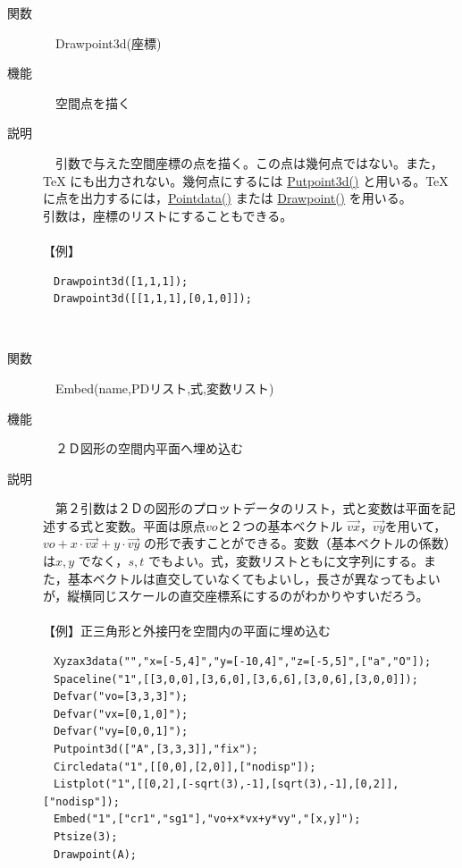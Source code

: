 \documentclass[papersize,a4paper,12pt,uplatex]{jsarticle}
\begin{document}
\begin{description}
\hypertarget{drawpoint3d}{}
\item[関数]　Drawpoint3d(座標)
\item[機能]　空間点を描く
\item[説明]　引数で与えた空間座標の点を描く。この点は幾何点ではない。また，TeX にも出力されない。幾何点にするには \hyperlink{putpoint3d}{Putpoint3d()} と用いる。TeXに点を出力するには，\hyperlink{pointdata}{Pointdata()} または \hyperlink{drwpt}{Drawpoint()} を用いる。\\
引数は，座標のリストにすることもできる。\\
　\\
【例】
\begin{verbatim}
　Drawpoint3d([1,1,1]);
　Drawpoint3d([[1,1,1],[0,1,0]]);
\end{verbatim}
　\\

\hypertarget{embed}{}
\item[関数]　Embed(name,PDリスト,式,変数リスト)
\item[機能]　２Ｄ図形の空間内平面へ埋め込む
\item[説明]　第２引数は２Ｄの図形のプロットデータのリスト，式と変数は平面を記述する式と変数。平面は原点$vo$と２つの基本ベクトル $\overrightarrow{vx}，\overrightarrow{vy}$を用いて，$vo+x \cdot \overrightarrow{vx}+y \cdot \overrightarrow{vy}$ の形で表すことができる。変数（基本ベクトルの係数）は$x,y$ でなく，$s,t$ でもよい。式，変数リストともに文字列にする。また，基本ベクトルは直交していなくてもよいし，長さが異なってもよいが，縦横同じスケールの直交座標系にするのがわかりやすいだろう。\\
　\\
【例】正三角形と外接円を空間内の平面に埋め込む
\begin{verbatim}
　Xyzax3data("","x=[-5,4]","y=[-10,4]","z=[-5,5]",["a","O"]);
　Spaceline("1",[[3,0,0],[3,6,0],[3,6,6],[3,0,6],[3,0,0]]);
　Defvar("vo=[3,3,3]");
　Defvar("vx=[0,1,0]");
　Defvar("vy=[0,0,1]");
　Putpoint3d(["A",[3,3,3]],"fix");
　Circledata("1",[[0,0],[2,0]],["nodisp"]);
　Listplot("1",[[0,2],[-sqrt(3),-1],[sqrt(3),-1],[0,2]],["nodisp"]);
　Embed("1",["cr1","sg1"],"vo+x*vx+y*vy","[x,y]");
　Ptsize(3);
　Drawpoint(A);
\end{verbatim}
 　　　　


\end{description}
\end{document}
